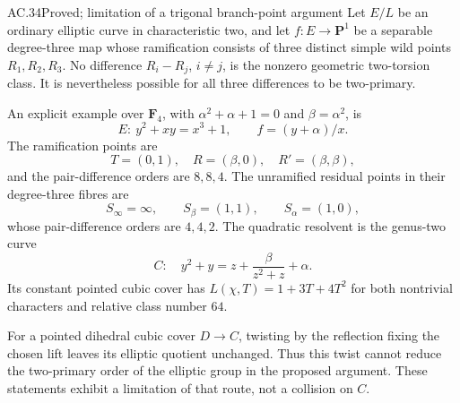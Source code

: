 \begin{claim}{AC.34}{Proved; limitation of a trigonal branch-point argument}
Let \(E/L\) be an ordinary elliptic curve in characteristic two,
and let \(f:E\to\mathbf P^1\) be a separable degree-three map
whose ramification consists of three distinct simple wild points
\(R_1,R_2,R_3\). No difference \(R_i-R_j\), \(i\ne j\), is the
nonzero geometric two-torsion class. It is nevertheless possible
for all three differences to be two-primary.

An explicit example over \(\mathbf F_4\), with
\(\alpha^2+\alpha+1=0\) and \(\beta=\alpha^2\), is
\[
 E:\ y^2+xy=x^3+1,\qquad f=(y+\alpha)/x.
\]
The ramification points are
\[
 T=(0,1),\quad R=(\beta,0),\quad R'=(\beta,\beta),
\]
and the pair-difference orders are \(8,8,4\).
The unramified residual points in their degree-three fibres are
\[
 S_\infty=\infty,\qquad S_\beta=(1,1),\qquad S_\alpha=(1,0),
\]
whose pair-difference orders are \(4,4,2\).
The quadratic resolvent is the genus-two curve
\[
 C:\quad y^2+y=z+\frac{\beta}{z^2+z}+\alpha.
\]
Its constant pointed cubic cover has
\(L(\chi,T)=1+3T+4T^2\) for both nontrivial characters and
relative class number \(64\).

For a pointed dihedral cubic cover \(D\to C\), twisting by the
reflection fixing the chosen lift leaves its elliptic quotient
unchanged. Thus this twist cannot reduce the two-primary order
of the elliptic group in the proposed argument.
These statements exhibit a limitation of that route, not a
collision on \(C\).
\end{claim}
